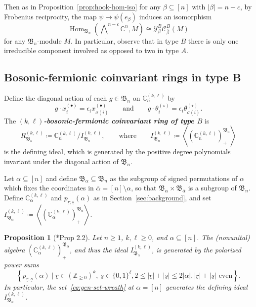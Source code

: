 \documentclass[11pt, reqno]{amsart}
\newtheorem{proposition}[theorem]{Proposition}
\theoremstyle{definition}
\theoremstyle{remark}
\numberwithin{equation}{section}
\newcommand{\0}{\emptyset}
\newcommand{\Z}{\mathbb{Z}}
\newcommand{\C}{\mathbb{C}}
\newcommand{\cC}{\mathcal{C}}
\newcommand{\cY}{\mathcal{Y}}
\renewcommand{\r}{\underline{r}}
\newcommand{\s}{\underline{s}}
\DeclareMathOperator{\Hom}{Hom}
\newcommand{\newword}[1]{\emph{\textbf{#1}}}
\begin{document}
Then as in Proposition~\ref{prop:hook-hom-iso} for any $\beta \subseteq [n]$ with $|\beta|=n-c$, 
by Frobenius reciprocity, the map $\psi \mapsto \psi(e_\beta)$ induces an isomorphism 
\begin{equation}\label{eq:hoom-hom-iso-B} 
    \Hom_{\mathfrak{B}_n}\left(\bigwedge\nolimits^{n-c} \C^n, M\right)
    \cong \cY^B_\beta \cC^B_{\overline{\beta}}(M)
\end{equation}
for any $\mathfrak{B}_n$-module $M$. 
In particular, observe that in type $B$ there is only 
one irreducible component involved as opposed to two in type $A$. 

\subsection{Bosonic-fermionic coinvariant rings in type B}

Define the diagonal action of each $g \in \mathfrak{B}_n$ on $\C_n^{(k,\ell)}$ by 
\begin{equation*}
    g \cdot x_i^{(\bullet)} = \epsilon_i x_{\sigma(i)}^{(\bullet)} \qquad \text{and} \qquad g \cdot \theta_i^{(\star)} = \epsilon_i \theta_{\sigma(i)}^{(\star)}.
\end{equation*}
The \newword{$(k,\ell)$-bosonic-fermionic coinvariant ring of type $B$} is
\begin{equation}
    \label{eq:coinv-B} 
    R_{\mathfrak{B}_n}^{(k,\ell)} \coloneqq \C_n^{(k,\ell)}\big/ I_{\mathfrak{B}_n}^{(k,\ell)}, \qquad \text{where} \qquad  I_{\mathfrak{B}_n}^{(k,\ell)} \coloneqq 
    \left\langle \left(\C_n^{(k,\ell)}\right)^{\mathfrak{B}_n}_+
    \right\rangle
\end{equation}
is the defining ideal, which is generated by the positive degree polynomials 
invariant under the diagonal action of $\mathfrak{B}_n$. 

Let
$\alpha \subseteq [n]$ and define $\mathfrak{B}_\alpha \subseteq \mathfrak{B}_n$ 
as the subgroup of signed permutations of $\alpha$ which fixes the coordinates in 
$\overline{\alpha} = [n] \setminus \alpha$, so that 
$\mathfrak{B}_\alpha \times \mathfrak{B}_{\overline{\alpha}}$ 
is a subgroup of $\mathfrak{B}_n$. Define $\C_\alpha^{(k,\ell)}$ and 
$p_{\r;\s}(\alpha)$ as in Section~\ref{sec:background}, and set 
$I_{\mathfrak{B}_\alpha}^{(k,\ell)} \coloneqq 
\left\langle \left( \C_\alpha^{(k,\ell)} \right)^{\mathfrak{B}_\alpha}_+ \right\rangle$.

\begin{proposition}[{\cite{JiangLentfer}*{Prop 2.2}}]\label{prop:Weyl-wreath}
Let $n \geq 1$, $k,\ell \geq 0$, and $\alpha \subseteq [n]$.
The (nonunital) algebra $(\C^{(k,\ell)}_\alpha)_+^{\mathfrak{B}_\alpha}$, and thus the ideal
$I_{\mathfrak{B}_\alpha}^{(k,\ell)}$,
is generated by the polarized power sums 
\begin{equation}\label{eq:gen-set-wreath}
    \left \{ p_{\r;\s}(\alpha) \mid
    \r \in (\Z_{\geq 0})^k,\ \s \in \{0,1\}^\ell, 
    2 \leq |\r|+|\s| \leq 2|\alpha|, |\r| + |\s| \text{ even} \right \}.
\end{equation}
In particular, the set~\eqref{eq:gen-set-wreath} at $\alpha = [n]$ 
generates the defining ideal $I_{\mathfrak{B}_n}^{(k,\ell)}$.
\end{proposition}
\end{document}
